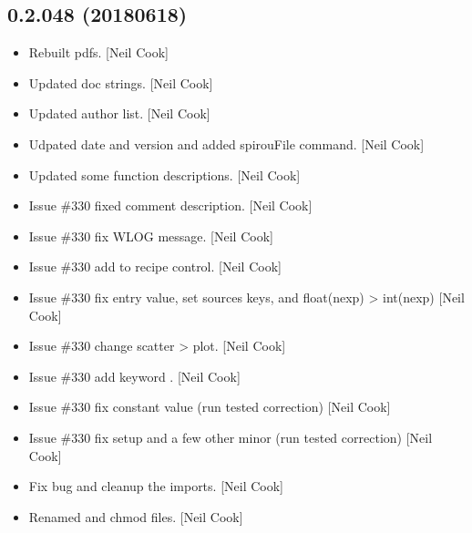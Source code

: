 \documentclass[a4paper,10pt,english]{report}
\begin{document}
\subsection{0.2.048 (2018\sphinxhyphen{}06\sphinxhyphen{}18)}
\label{\detokenize{misc/changelog:id437}}\begin{itemize}
\item {} 
Rebuilt pdfs. {[}Neil Cook{]}

\item {} 
Updated doc strings. {[}Neil Cook{]}

\item {} 
Updated author list. {[}Neil Cook{]}

\item {} 
Udpated date and version and added spirouFile command. {[}Neil Cook{]}

\item {} 
Updated some function descriptions. {[}Neil Cook{]}

\item {} 
Issue \#330 \sphinxhyphen{} fixed comment description. {[}Neil Cook{]}

\item {} 
Issue \#330 \sphinxhyphen{} fix WLOG message. {[}Neil Cook{]}

\item {} 
Issue \#330 \sphinxhyphen{} add  to recipe control. {[}Neil Cook{]}

\item {} 
Issue \#330 \sphinxhyphen{} fix entry value, set sources keys, and float(nexp) \textendash{}\textgreater{}
int(nexp) {[}Neil Cook{]}

\item {} 
Issue \#330 \sphinxhyphen{} change scatter \textendash{}\textgreater{} plot. {[}Neil Cook{]}

\item {} 
Issue \#330 \sphinxhyphen{} add keyword . {[}Neil Cook{]}

\item {} 
Issue \#330 \sphinxhyphen{} fix constant value (run tested correction) {[}Neil Cook{]}

\item {} 
Issue \#330 \sphinxhyphen{} fix setup and a few other minor (run tested correction)
{[}Neil Cook{]}

\item {} 
Fix bug and cleanup the imports. {[}Neil Cook{]}

\item {} 
Renamed and chmod files. {[}Neil Cook{]}


\end{itemize}
\end{document}
